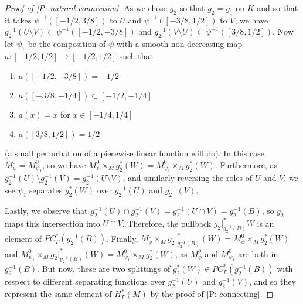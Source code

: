\documentclass[12pt]{article}
\theoremstyle{plain}
\theoremstyle{definition}
\theoremstyle{remark}
\begin{document}
\begin{proof}[Proof of \cref{P: natural connection}]
	As we chose $g_2$ so that $g_2 = g_1$ on $K$ and so that it takes $\psi^{-1}([-1/2,3/8])$ to $U$ and $\psi^{-1}([-3/8,1/2])$ to $V$, we have $g_2^{-1}(U \setminus V) \subset \psi^{-1}([-1/2,-3/8])$ and $g_2^{-1}(V \setminus U) \subset \psi^{-1}([3/8,1/2])$.
	Now let $\psi_1$ be the composition of $\psi$ with a smooth non-decreasing map $a: [-1/2,1/2] \to [-1/2,1/2]$ such that
	\begin{enumerate}
		\item $a([-1/2,-3/8]) = -1/2$
		\item $a([-3/8, -1/4]) \subset [-1/2, -1/4]$
		\item $a(x)=x$ for $x \in [-1/4,1/4]$
		\item $a([3/8,1/2]) = 1/2$
	\end{enumerate}
	(a small perturbation of a piecewise linear function will do).
	In this case $M^0_\psi = M^0_{\psi_1}$, so we have $M^0_\psi \times_M g_2^*(W) = M^0_{\psi_1} \times_M g_2^*(W)$.
	Furthermore, as $g_2^{-1}(U) \setminus g_2^{-1}(V) = g_2^{-1}(U \setminus V)$, and similarly reversing the roles of $U$ and $V$, we see $\psi_1$ separates $g_2^*(W)$ over $g_2^{-1}(U)$ and $g_2^{-1}(V)$.

	Lastly, we observe that $g_2^{-1}(U) \cap g_2^{-1}(V) = g_2^{-1} (U \cap V) = g_2^{-1}(B)$, so $g_2$ maps this intersection into $U \cap V$.
	Therefore, the pullback $g_2|_{g_2^{-1} (B)}^* W$ is an element of $PC^*_\Gamma(g_2^{-1} (B))$.
	Finally, $M^0_\phi \times_M	g_2|_{g_2^{-1} (B)}^* (W) = M^0_\phi \times_M g_2^*(W)$ and $M^0_{\psi_1} \times_M g_2|_{g_2^{-1} (B)}^* (W) = M^0_{\psi_1} \times_M g_2^*(W)$, as $M^0_\phi$ and $M^0_{\psi_1}$ are both in $g_2^{-1} (B)$.
	But now, these are two splittings of $g_2^*(W) \in PC^*_\Gamma(g_2^{-1} (B))$ with respect to different separating functions over $g_2^{-1}(U)$ and $g_2^{-1}(V)$, and so they represent the same element of $H^*_\Gamma(M)$ by the proof of \cref{P: connecting}.
\end{proof}
\end{document}
